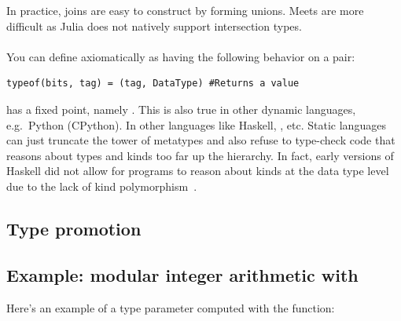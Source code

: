 \documentclass[pldi]{sigplanconf-pldi15}
\begin{document}
In practice, joins are easy to construct by forming unions.  Meets are more
difficult as Julia does not natively support intersection types.


\paragraph{}

You can define  axiomatically as having the following behavior on a  pair:

\begin{verbatim}
typeof(bits, tag) = (tag, DataType) #Returns a value
\end{verbatim}

 has a fixed point, namely . This is
also true in other dynamic languages, e.g.\ Python (CPython). In other
languages like Haskell, , etc. Static languages
can just truncate the tower of metatypes and also refuse to type-check code
that reasons about types and kinds too far up the hierarchy. In fact, early
versions of Haskell did not allow for programs to reason about kinds at the
data type level due to the lack of kind polymorphism~\cite{haskellkindtypes}.



\subsection{Type promotion}

\subsection{Example: modular integer arithmetic with }

Here's an example of a type parameter computed with the  function:
\end{document}
